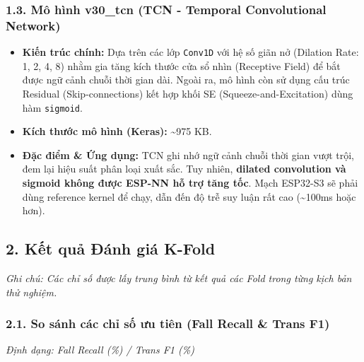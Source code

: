 \documentclass[12pt,a4paper]{article}
\providecommand{\tightlist}{\setlength{\itemsep}{0pt}\setlength{\parskip}{0pt}}
\begin{document}
\subsubsection{1.3. Mô hình v30\_tcn (TCN - Temporal Convolutional
Network)}\label{muxf4-huxecnh-v30_tcn-tcn---temporal-convolutional-network}

\begin{itemize}
\tightlist
\item
  \textbf{Kiến trúc chính:} Dựa trên các lớp \texttt{Conv1D} với hệ số
  giãn nở (Dilation Rate: 1, 2, 4, 8) nhằm gia tăng kích thước cửa sổ
  nhìn (Receptive Field) để bắt được ngữ cảnh chuỗi thời gian dài. Ngoài
  ra, mô hình còn sử dụng cấu trúc Residual (Skip-connections) kết hợp
  khối SE (Squeeze-and-Excitation) dùng hàm \texttt{sigmoid}.
\item
  \textbf{Kích thước mô hình (Keras):} \textasciitilde975 KB.
\item
  \textbf{Đặc điểm \& Ứng dụng:} TCN ghi nhớ ngữ cảnh chuỗi thời gian
  vượt trội, đem lại hiệu suất phân loại xuất sắc. Tuy nhiên,
  \textbf{dilated convolution và sigmoid không được ESP-NN hỗ trợ tăng
  tốc}. Mạch ESP32-S3 sẽ phải dùng reference kernel để chạy, dẫn đến độ
  trễ suy luận rất cao (\textasciitilde100ms hoặc hơn).
\end{itemize}

\subsection{2. Kết quả Đánh giá
K-Fold}\label{kux1ebft-quux1ea3-ux111uxe1nh-giuxe1-k-fold}

\emph{Ghi chú: Các chỉ số được lấy trung bình từ kết quả các Fold trong
từng kịch bản thử nghiệm.}

\subsubsection{2.1. So sánh các chỉ số ưu tiên (Fall Recall \& Trans
F1)}\label{so-suxe1nh-cuxe1c-chux1ec9-sux1ed1-ux1b0u-tiuxean-fall-recall-trans-f1}

\emph{Định dạng: Fall Recall (\%) / Trans F1 (\%)}
\end{document}
